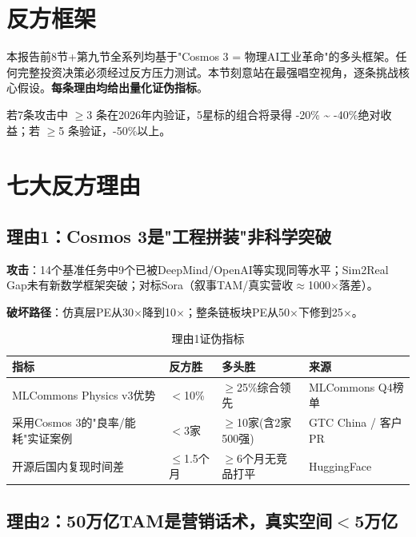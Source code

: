 \section{反方框架}

本报告前8节+第九节全系列均基于"Cosmos 3 = 物理AI工业革命"的多头框架。任何完整投资决策必须经过反方压力测试。本节刻意站在最强唱空视角，逐条挑战核心假设。\textbf{每条理由均给出量化证伪指标}。

\begin{keyinsight}[反方核心结论]
若7条攻击中 $\geq$3 条在2026年内验证，5星标的组合将录得 -20\% \textasciitilde{} -40\%绝对收益；若 $\geq$5 条验证，-50\%以上。
\end{keyinsight}

\section{七大反方理由}

\subsection{理由1：Cosmos 3是"工程拼装"非科学突破}

\textbf{攻击}：14个基准任务中9个已被DeepMind/OpenAI等实现同等水平；Sim2Real Gap未有新数学框架突破；对标Sora（叙事TAM/真实营收$\approx$1000$\times$落差）。

\textbf{破坏路径}：仿真层PE从30$\times$降到10$\times$；整条链板块PE从50$\times$下修到25$\times$。

\begin{table}[H]
\centering\scriptsize
\renewcommand{\arraystretch}{1.1}
\begin{tabularx}{\textwidth}{l X X l}
\toprule
\textbf{指标} & \textbf{反方胜} & \textbf{多头胜} & \textbf{来源} \\
\midrule
MLCommons Physics v3优势 & $<$10\% & $\geq$25\%综合领先 & MLCommons Q4榜单 \\
采用Cosmos 3的"良率/能耗"实证案例 & $<$3家 & $\geq$10家(含2家500强) & GTC China / 客户PR \\
开源后国内复现时间差 & $\leq$1.5个月 & $\geq$6个月无竞品打平 & HuggingFace \\
\bottomrule
\end{tabularx}
\caption{理由1证伪指标}
\end{table}

\subsection{理由2：50万亿TAM是营销话术，真实空间$<$5万亿}

